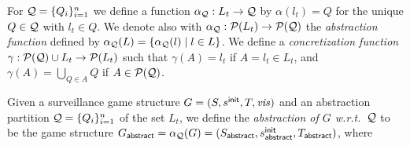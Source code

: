 For $\mathcal{Q} = \{Q_i\}_{i=1}^n$  we define a function $\alpha_{\mathcal{Q}} : L_t \to \mathcal{Q}$ by $\alpha(l_t) = Q$ for the unique $Q \in \mathcal{Q}$ with $l_t \in Q$. We denote also with $\alpha_{\mathcal{Q}} : \mathcal{P}(L_t) \to \mathcal{P}(\mathcal{Q})$ the \emph{abstraction function} defined by $\alpha_{\mathcal{Q}}(L) = \{\alpha_{\mathcal{Q}}(l) \mid l \in L\}$.
We define a \emph{concretization function} $\gamma :  \mathcal{P}(\mathcal{Q}) \cup L_t \to \mathcal{P}(L_t)$ such that 
$\gamma(A) = l_t$ if $A = l_t \in L_t$, and  $\gamma(A) = \bigcup_{Q \in A} Q$ if $A \in \mathcal{P}(\mathcal{Q})$.

Given a surveillance game structure $G  = (S,s^{\mathsf{init}},T,\mathit{vis})$ and an abstraction partition $\mathcal{Q} = \{Q_i\}_{i=1}^n$ of the set $L_t$, we define the \emph{abstraction of $G$ w.r.t.\ $\mathcal{Q}$} to be the game structure 
$G_{\mathsf{abstract}}  = \alpha_{\mathcal{Q}}(G)= (S_{\mathsf{abstract}},s^{\mathsf{init}}_{\mathsf{abstract}},T_{\mathsf{abstract}})$, where

